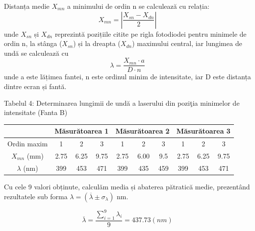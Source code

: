 \documentclass{article}
\begin{document}
\makebox[1cm]{} Distanța medie ${X}{_{mn}}$ a minimului de ordin n se calculează cu relația:
\begin{equation*}
    {X}{_{mn}} = |\frac{{X}{_{sn}} - {X}{_{dn}}}{2}|
\end{equation*}
unde ${X}{_{sn}}$ și ${X}{_{dn}}$ reprezintă pozițiile citite pe rigla fotodiodei pentru minimele de ordin n, la stânga (${X}{_{sn}}$) și la dreapta (${X}{_{dn}}$) maximului central,
iar lungimea de undă se calculează cu
\begin{equation*}
    \lambda = \frac{{X}{_{mn}}\cdot a}{D\cdot n}
\end{equation*}
unde a este lățimea fantei, n este ordinul minim de intensitate, iar D este distanța dintre ecran și fantă. \newline

\makebox[-1cm]{} Tabelul 4: Determinarea lungimii de undă a laserului din poziţia minimelor de intensitate (Fanta B)

\begin{table}[H]
    \begin{tabular}{|c|ccc|ccc|ccc|}
    \hline
                      & \multicolumn{3}{c|}{Măsurătoarea 1}                          & \multicolumn{3}{c|}{Măsurătoarea 2}                         & \multicolumn{3}{c|}{Măsurătoarea 3}                          \\ \hline
    Ordin maxim       & \multicolumn{1}{c|}{1}    & \multicolumn{1}{c|}{2}    & 3    & \multicolumn{1}{c|}{1}    & \multicolumn{1}{c|}{2}    & 3   & \multicolumn{1}{c|}{1}    & \multicolumn{1}{c|}{2}    & 3    \\ \hline
    ${X}{_{mn}}$ (mm) & \multicolumn{1}{c|}{2.75} & \multicolumn{1}{c|}{6.25} & 9.75 & \multicolumn{1}{c|}{2.75} & \multicolumn{1}{c|}{6.00} & 9.5 & \multicolumn{1}{c|}{2.75} & \multicolumn{1}{c|}{6.25} & 9.75 \\ \hline
    $\lambda$ (nm)    & \multicolumn{1}{c|}{399}  & \multicolumn{1}{c|}{453}  & 471  & \multicolumn{1}{c|}{399}  & \multicolumn{1}{c|}{435}  & 459 & \multicolumn{1}{c|}{399}  & \multicolumn{1}{c|}{453}  & 471  \\ \hline
    \end{tabular}
    \end{table}

Cu cele 9 valori obținute, calculăm media și abaterea pătratică medie, prezentând rezultatele sub forma $\lambda = (\overline{\lambda} \pm {\sigma}{_{\lambda}})$ nm.

\begin{equation}
    \overline{\lambda} = \frac{\sum_{i=1}^{9}{\lambda}{_i}}{9} = 437.73 (nm)
\end{equation}
\end{document}
